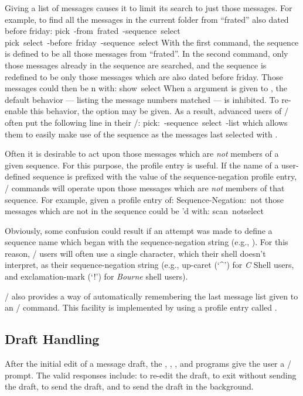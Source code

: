 Giving  a list of messages causes it to limit its search to just
those messages.
For example,
to find all the messages in the current folder from ``frated'' also dated
before friday:
\example pick\ -from\ frated\ -sequence\ select\\
	 pick\ select\ -before\ friday\ -sequence\ select\endexample
With the first  command,
the sequence  is defined
to be all those messages from ``frated''.
In the second command, only those messages already in the 
sequence are searched, and the  sequence is redefined to be
only those messages which are also
dated before friday.
Those messages could then be n with:
\example show\ select\endexample
When a  argument is given to ,
the default behavior --- listing the message numbers
matched --- is inhibited.
To re-enable this behavior, the  option may be given.
As a result,
advanced users of \MH/ often put the following line in their \profile/:
\example pick:\ -sequence\ select\ -list\endexample
which allows them to easily make use of the  sequence as the
messages last selected with .

Often it is desirable to act upon those messages which
are {\it not} members of a given sequence.
For this purpose,
the  profile entry is useful.
If the name of a user-defined sequence is prefixed with the value of the
sequence-negation profile entry,
\MH/ commands will operate upon those messages which are {\it not} members
of that sequence.
For example, given a profile entry of:
\example Sequence-Negation:\ not\endexample
those messages which
are not in the  sequence could be 'd with:
\example scan\ notselect\endexample

Obviously, some confusion could result if an attempt was made
to define a sequence name
which began with the sequence-negation string (e.g., ).
For this reason, \MH/ users will often use a single
character,
which their shell doesn't interpret,
as their sequence-negation string
(e.g., up-caret (`\^{}') for {\it C} Shell users,
and exclamation-mark (`!') for {\it Bourne} shell users).

\MH/ also provides a way of automatically remembering the last
message list given to
an \MH/ command.
This facility is implemented by using a profile entry called
.

\subsection{Draft Handling}			%
After the initial edit of a message draft,
the , , , and  programs
give the user a \whatnow/ prompt.
The valid responses include:
 to re-edit the draft,
 to exit without sending the draft,
 to send the draft, and
 to send the draft in the background.


